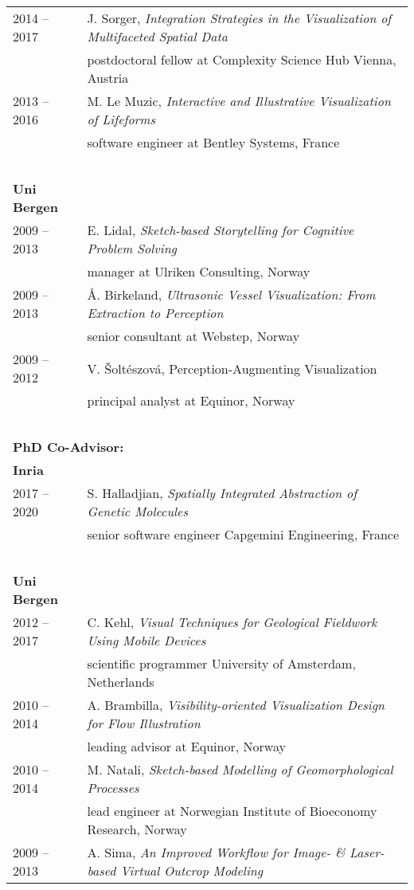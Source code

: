 \documentclass[a4paper,11pt]{letter}
\begin{document}
\begin{tabular}{l| l}
2014 -- 2017 & J. Sorger, \emph{Integration Strategies in the Visualization of Multifaceted Spatial Data} \\
 & postdoctoral fellow at Complexity Science Hub Vienna, Austria \\
2013 -- 2016 & M. Le Muzic, \emph{Interactive and Illustrative Visualization of Lifeforms} \\
 & software engineer at Bentley Systems, France \\
\hline
\multicolumn{2}{l}{\textbf{~}} \\
\textbf{Uni Bergen} & \\
2009 -- 2013 & E. Lidal, \emph{Sketch-based Storytelling for Cognitive Problem Solving} \\
 & manager at Ulriken Consulting, Norway \\
2009 -- 2013 & \AA. Birkeland, \emph{Ultrasonic Vessel Visualization: From Extraction to Perception} \\
 & senior consultant at Webstep, Norway \\
2009 -- 2012 & V. {\v S}olt\'eszov\'a, Perception-Augmenting Visualization \\
 & principal analyst at Equinor, Norway \\
\multicolumn{2}{l}{\textbf{~}} \\
\multicolumn{2}{l}{\textbf{PhD Co-Advisor:}} \\
\textbf{Inria} & \\
2017 -- 2020 & S. Halladjian, \emph{Spatially Integrated Abstraction of Genetic Molecules} \\
 &  senior software engineer Capgemini Engineering, France\\
\hline
\multicolumn{2}{l}{\textbf{~}} \\
\textbf{Uni Bergen} & \\
2012 -- 2017 & C. Kehl, \emph{Visual Techniques for Geological Fieldwork Using Mobile Devices}\\
 & scientific programmer University of Amsterdam, Netherlands \\
2010 -- 2014 & A. Brambilla, \emph{Visibility-oriented Visualization Design for Flow Illustration}\\
 & leading advisor at Equinor, Norway \\
2010 -- 2014 & M. Natali, \emph{Sketch-based Modelling of Geomorphological Processes} \\
 & lead engineer at Norwegian Institute of Bioeconomy Research, Norway \\
2009 -- 2013 & A. Sima, \emph{An Improved Workflow for Image- \& Laser-based Virtual Outcrop Modeling} \\

\end{tabular}
\end{document}

